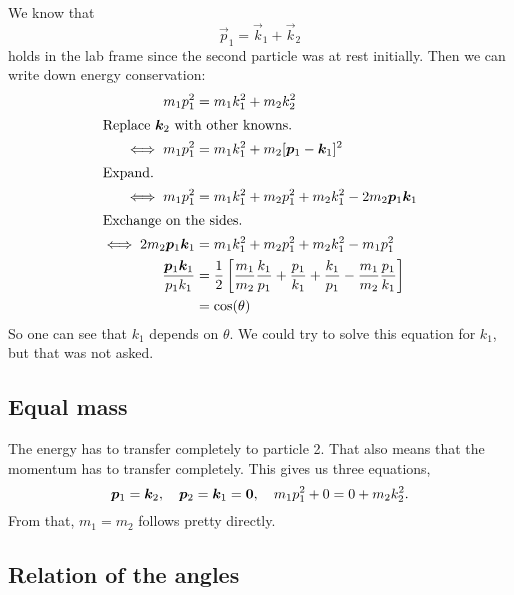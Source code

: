 \documentclass[11pt, english, fleqn, DIV=15, headinclude, BCOR=1.5cm]{scrartcl}
\begin{document}
We know that
\[
    \vec p_1 = \vec k_1 + \vec k_2
\]
holds in the lab frame since the second particle was at rest initially. Then we
can write down energy conservation:
\begin{align*}
    m_1 p_1^2 &= m_1 k_1^2 + m_2 k_2^2 \\
    \intertext{%
        Replace $\vec k_2$ with other knowns.
    }
    \iff m_1 p_1^2 &= m_1 k_1^2 + m_2 [\vec p_1 - \vec k_1]^2 \\
    \intertext{%
        Expand.
    }
    \iff m_1 p_1^2 &= m_1 k_1^2 + m_2 p_1^2 + m_2 k_1^2 - 2 m_2 \vec p_1 \vec k_1 \\
    \intertext{%
        Exchange on the sides.
    }
    \iff 2 m_2 \vec p_1 \vec k_1 &= m_1 k_1^2 + m_2 p_1^2 + m_2 k_1^2 - m_1 p_1^2  \\
    \frac{\vec p_1 \vec k_1}{p_1 k_1} &= \frac 12 \sbr{
        \frac{m_1}{m_2} \frac{k_1}{p_1} + \frac{p_1}{k_1} + \frac{k_1}{p_1} -
        \frac{m_1}{m_2} \frac{p_1}{k_1}
    } \\
    &= \cos(\theta)
\end{align*}
So one can see that $k_1$ depends on $\theta$. We could try to solve this
equation for $k_1$, but that was not asked.

\subsection{Equal mass}

The energy has to transfer completely to particle 2. That also means that the
momentum has to transfer completely. This gives us three equations,
\[
    \boldsymbol{p}_1 = \boldsymbol{k}_2
    ,\quad
    \boldsymbol{p}_2 = \boldsymbol{k}_1 = \boldsymbol{0}
    ,\quad
    m_1 p_1^2 + 0 = 0 + m_2 k_2^2.
\]
From that, $m_1 = m_2$ follows pretty directly.

\subsection{Relation of the angles}

\newcommand\w{{v_1^*}}
\newcommand\ct{\cos(\theta^*)}
\end{document}
